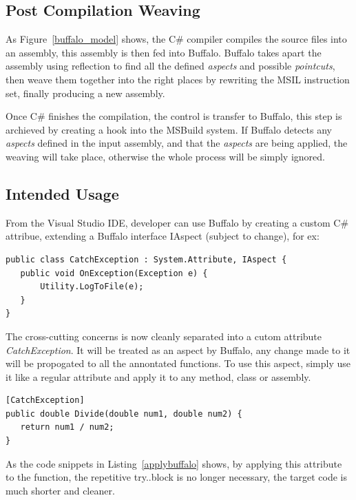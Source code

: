 \subsection{Post Compilation Weaving}
As Figure~\ref{buffalo_model} shows, the C\# compiler compiles the source files into an assembly, this assembly is then fed into Buffalo. Buffalo takes apart the assembly using reflection to find all the defined {\em aspects} and possible {\em pointcuts}, then weave them together into the right places by rewriting the MSIL instruction set, finally producing a new assembly.

Once C\# finishes the compilation, the control is transfer to Buffalo, this step is archieved by creating a hook into the MSBuild system. If Buffalo detects any {\em aspects} defined in the input assembly, and that the {\em aspects} are being applied, the weaving will take place, otherwise the whole process will be simply ignored.

\subsection{Intended Usage}
From the Visual Studio IDE, developer can use Buffalo by creating a custom C\# attribue, extending a Buffalo interface IAspect (subject to change), for ex:

\begin{lstlisting}[caption={Buffalo aspect}, label=buffalocode]
public class CatchException : System.Attribute, IAspect {
   public void OnException(Exception e) {
       Utility.LogToFile(e);
   } 
}
\end{lstlisting}

The cross-cutting concerns is now cleanly separated into a cutom attribute {\em CatchException}. It will be treated as an aspect by Buffalo, any change made to it will be propogated to all the annontated functions. To use this aspect, simply use it like a regular attribute and apply it to any method, class or assembly.

\begin{lstlisting}[caption={applying Buffalo aspect}, label=applybuffalo]
[CatchException]
public double Divide(double num1, double num2) {
   return num1 / num2;
}
\end{lstlisting}

As the code snippets in Listing~\ref{applybuffalo} shows, by applying this attribute to the function, the repetitive try..block is no longer necessary, the target code is much shorter and cleaner. 

